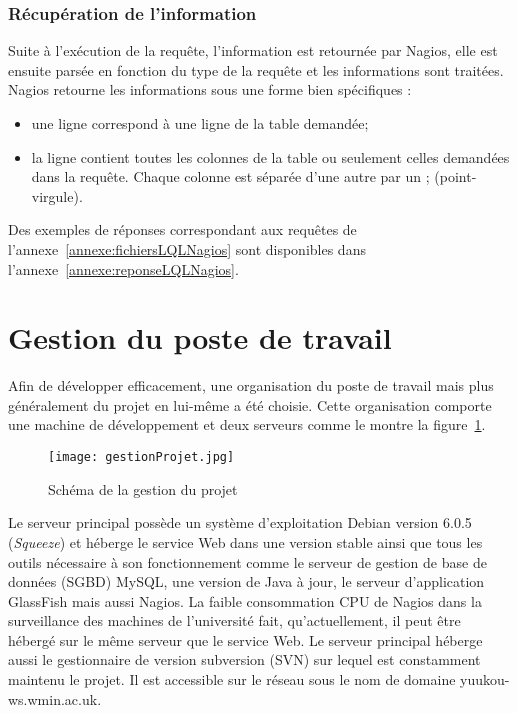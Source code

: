 \subsubsection{R\'ecup\'eration de l'information}

Suite \`a l'ex\'ecution de la requ\^ete, l'information est retourn\'ee par Nagios, elle est ensuite pars\'ee en fonction du type de la requ\^ete et les informations sont trait\'ees.
Nagios retourne les informations sous une forme bien sp\'ecifiques : 

\begin{itemize}
	\item une ligne correspond \`a une ligne de la table demand\'ee;
	\item la ligne contient toutes les colonnes de la table ou seulement celles demand\'ees dans la requ\^ete.
	Chaque colonne est s\'epar\'ee d'une autre par un \textsf{; (point-virgule)}.

\end{itemize}

\vspace{0.20cm}

Des exemples de r\'eponses correspondant aux requ\^etes de l'annexe~\ref{annexe:fichiersLQLNagios} sont disponibles dans l'annexe~\ref{annexe:reponseLQLNagios}.

\section{Gestion du poste de travail}
\label{section:gestionProjet}

Afin de d\'evelopper efficacement, une organisation du poste de travail mais plus g\'en\'eralement du projet en lui-m\^eme a \'et\'e choisie.
Cette organisation comporte une machine de d\'eveloppement et deux serveurs comme le montre la figure~\ref{figure:gestionProjet}.

\begin{figure}[!ht]
	\centering
	\texttt{[image: gestionProjet.jpg]}
	\caption{Sch\'ema de la gestion du projet}
	\label{figure:gestionProjet}

\end{figure}

Le serveur principal poss\`ede un syst\`eme d'exploitation Debian version 6.0.5 (\textit{Squeeze}) et h\'eberge le service Web dans une version stable ainsi que tous les outils n\'ecessaire \`a son fonctionnement comme le serveur de gestion de base de donn\'ees (SGBD) MySQL, une version de Java \`a jour, le serveur d'application GlassFish mais aussi Nagios.
La faible consommation CPU de Nagios dans la surveillance des machines de l'universit\'e fait, qu'actuellement, il peut \^etre h\'eberg\'e sur le m\^eme serveur que le service Web.
Le serveur principal h\'eberge aussi le gestionnaire de version subversion (SVN) sur lequel est constamment maintenu le projet.
Il est accessible sur le r\'eseau sous le nom de domaine \textsf{yuukou-ws.wmin.ac.uk}.

